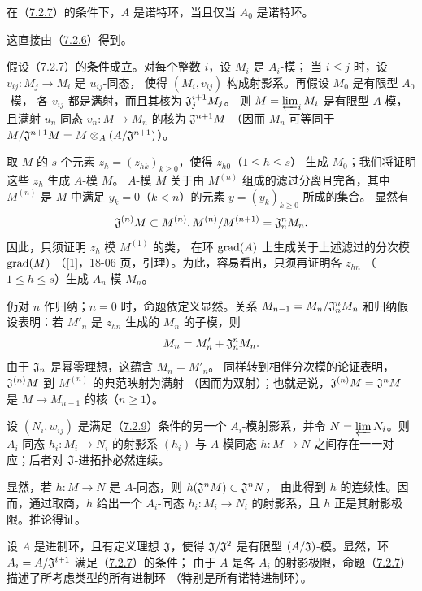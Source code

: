 在（\hyperlink{para:0:7.2.7}{7.2.7}）的条件下，$A$ 是诺特环，当且仅当 $A_0$ 是诺特环。

这直接由（\hyperlink{para:0:7.2.6}{7.2.6}）得到。

假设（\hyperlink{para:0:7.2.7}{7.2.7}）的条件成立。对每个整数 $i$，设 $M_i$ 是 $A_i$-模；
当 $i\leq j$ 时，设 $v_{ij}:M_j\to M_i$ 是 $u_{ij}$-同态，
使得 $(M_i,v_{ij})$ 构成射影系。再假设 $M_0$ 是有限型 $A_0$-模，
各 $v_{ij}$ 都是满射，而且其核为 $\mathfrak J_j^{i+1}M_j$。
则 $M=\varprojlim_i M_i$ 是有限型 $A$-模，且满射 $u_n$-同态
$v_n:M\to M_n$ 的核为 $\mathfrak J^{n+1}M$
（因而 $M_n$ 可等同于 $M/\mathfrak J^{n+1}M=M\otimes_A(A/\mathfrak J^{n+1})$）。

取 $M$ 的 $s$ 个元素 $z_h=(z_{hk})_{k\geq0}$，使得 $z_{h0}$（$1\leq h\leq s$）
生成 $M_0$；我们将证明这些 $z_h$ 生成 $A$-模 $M$。
$A$-模 $M$ 关于由 $M^{(n)}$ 组成的滤过分离且完备，其中 $M^{(n)}$ 是
$M$ 中满足 $y_k=0$（$k<n$）的元素 $y=(y_k)_{k\geq0}$ 所成的集合。
显然有
\[
 \mathfrak J^{(n)}M\subset M^{(n)},
 M^{(n)}/M^{(n+1)}=\mathfrak J_n^nM_n.
\]
因此，只须证明 $z_h$ 模 $M^{(1)}$ 的类，
在环 $\operatorname{grad}(A)$ 上生成关于上述滤过的分次模 $\operatorname{grad}(M)$
（[1]，18-06 页，引理）。为此，容易看出，只须再证明各 $z_{hn}$
（$1\leq h\leq s$）生成 $A_n$-模 $M_n$。

仍对 $n$ 作归纳；$n=0$ 时，命题依定义显然。关系
$M_{n-1}=M_n/\mathfrak J_n^nM_n$ 和归纳假设表明：若 $M'_n$ 是 $z_{hn}$
生成的 $M_n$ 的子模，则
\[
 M_n=M'_n+\mathfrak J_n^nM_n.
\]
由于 $\mathfrak J_n$ 是幂零理想，这蕴含 $M_n=M'_n$。
同样转到相伴分次模的论证表明，$\mathfrak J^{(n)}M$ 到 $M^{(n)}$ 的典范映射为满射
（因而为双射）；也就是说，$\mathfrak J^{(n)}M=\mathfrak J^nM$ 是
$M\to M_{n-1}$ 的核（$n\geq1$）。

设 $(N_i,w_{ij})$ 是满足（\hyperlink{para:0:7.2.9}{7.2.9}）条件的另一个 $A_i$-模射影系，并令
$N=\varprojlim N_i$。则 $A_i$-同态 $h_i:M_i\to N_i$ 的射影系 $(h_i)$
与 $A$-模同态 $h:M\to N$ 之间存在一一对应；后者对 $\mathfrak J$-进拓扑必然连续。

显然，若 $h:M\to N$ 是 $A$-同态，则 $h(\mathfrak J^nM)\subset\mathfrak J^nN$，
由此得到 $h$ 的连续性。因而，通过取商，$h$ 给出一个 $A_i$-同态
$h_i:M_i\to N_i$ 的射影系，且 $h$ 正是其射影极限。推论得证。

设 $A$ 是进制环，且有定义理想 $\mathfrak J$，使得 $\mathfrak J/\mathfrak J^2$ 是有限型
$(A/\mathfrak J)$-模。显然，环 $A_i=A/\mathfrak J^{i+1}$ 满足（\hyperlink{para:0:7.2.7}{7.2.7}）的条件；
由于 $A$ 是各 $A_i$ 的射影极限，命题（\hyperlink{para:0:7.2.7}{7.2.7}）描述了所考虑类型的所有进制环
（特别是所有诺特进制环）。


